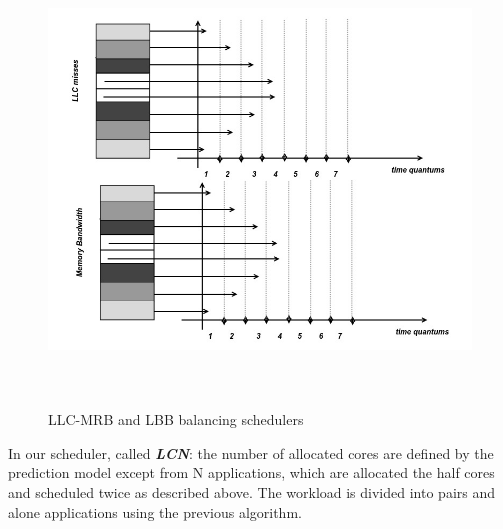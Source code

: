 \documentclass[diploma]{Styles/softlab-thesis}
\begin{document}
\begin{figure}[ht!]
\begin{center}
\includegraphics[width=150mm, height=120mm]{images/other_schedulers.jpg}
\caption{LLC-MRB and LBB balancing schedulers \label{overflow}}
\end{center}
\end{figure}

In our scheduler, called \textit{\textbf{LCN}}: the number of allocated cores are defined by the prediction model except from N applications, which are allocated the half cores and scheduled twice as described above. The workload is divided into pairs and alone applications using the previous algorithm. \\
\end{document}
